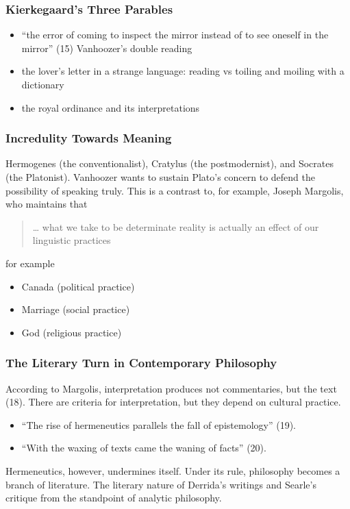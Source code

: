 \documentclass[xcolor=dvipsnames]{beamer}
\begin{document}
\begin{frame}
  \frametitle{Kierkegaard's Three Parables}
  \begin{itemize}
  \item ``the error of coming to inspect the mirror instead of to see
    oneself in the mirror'' (15) Vanhoozer's double reading
  \item the lover's letter in a strange language: reading vs toiling
    and moiling with a dictionary
  \item the royal ordinance and its interpretations
  \end{itemize}
\end{frame}

\begin{frame}
  \frametitle{Incredulity Towards Meaning}
  Hermogenes (the conventionalist), Cratylus (the postmodernist), and
  Socrates (the Platonist). Vanhoozer wants to sustain Plato's concern
  to defend the possibility of speaking truly. This is a contrast to,
  for example, Joseph Margolis, who maintains that
  \begin{quote}
    {\ldots} what we take to be determinate reality is actually an
    effect of our linguistic practices
  \end{quote}
  for example
  \begin{itemize}
  \item Canada (political practice)
  \item Marriage (social practice)
  \item God (religious practice)
  \end{itemize}
\end{frame}

\begin{frame}
  \frametitle{The Literary Turn in Contemporary Philosophy}
According to Margolis, interpretation produces not commentaries, but
the text (18). There are criteria for interpretation, but they depend
on cultural practice.
\begin{itemize}
\item ``The rise of hermeneutics parallels the fall of epistemology''
  (19).
\item ``With the waxing of texts came the waning of facts'' (20).
\end{itemize}
Hermeneutics, however, undermines itself. Under its rule, philosophy
becomes a branch of literature. The literary nature of Derrida's
writings and Searle's critique from the standpoint of analytic
philosophy. 
\end{frame}
\end{document}
